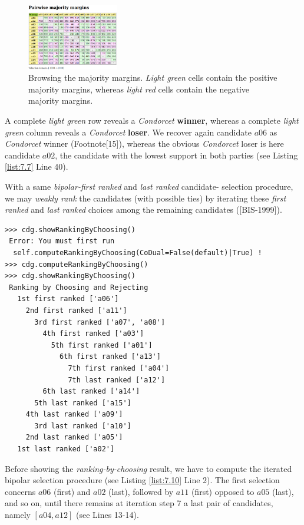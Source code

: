 \begin{figure}[h]
\sidecaption
\includegraphics[width=4cm]{Figures/majorityMargins.png}
\caption{Browsing the majority margins. \emph{Light green} cells contain the positive majority margins, whereas \emph{light red} cells contain the negative majority margins.}
\label{fig:7.4}       %
\end{figure}

A complete \emph{light green} row reveals a \emph{Condorcet} \textbf{winner}, whereas a complete \emph{light green} column reveals a \emph{Condorcet} \textbf{loser}. We recover again candidate $a06$ as \emph{Condorcet} winner (Footnote[15]), whereas the obvious \emph{Condorcet} loser is here candidate $a02$, the candidate with the lowest support in both parties (see Listing \ref{list:7.7} Line 40).

With a same \emph{bipolar-first ranked} and \emph{last ranked} candidate- selection procedure, we may \emph{weakly rank} the candidates (with possible ties) by iterating these \emph{first ranked} and \emph{last ranked} choices among the remaining candidates ([BIS-1999]).

\begin{lstlisting}[caption={Ranking by iterating choosing the \emph{first} and \emph{last} remaining candidates },label=list:7.10,basicstyle=\footnotesize]
>>> cdg.showRankingByChoosing()
 Error: You must first run
  self.computeRankingByChoosing(CoDual=False(default)|True) !
>>> cdg.computeRankingByChoosing()
>>> cdg.showRankingByChoosing()
 Ranking by Choosing and Rejecting
   1st first ranked ['a06']
     2nd first ranked ['a11']
       3rd first ranked ['a07', 'a08']
         4th first ranked ['a03']
           5th first ranked ['a01']
             6th first ranked ['a13']
               7th first ranked ['a04']
               7th last ranked ['a12']
	     6th last ranked ['a14']
	   5th last ranked ['a15']
	 4th last ranked ['a09']
       3rd last ranked ['a10']
     2nd last ranked ['a05']
   1st last ranked ['a02']
\end{lstlisting}
 
Before showing the \emph{ranking-by-choosing} result, we have to compute the iterated bipolar selection procedure (see Listing \ref{list:7.10} Line 2). The first selection concerns $a06$ (first) and $a02$ (last), followed by $a11$ (first) opposed to $a05$ (last), and so on, until there remains at iteration step 7 a last pair of candidates, namely $[a04, a12]$ (see Lines 13-14).

